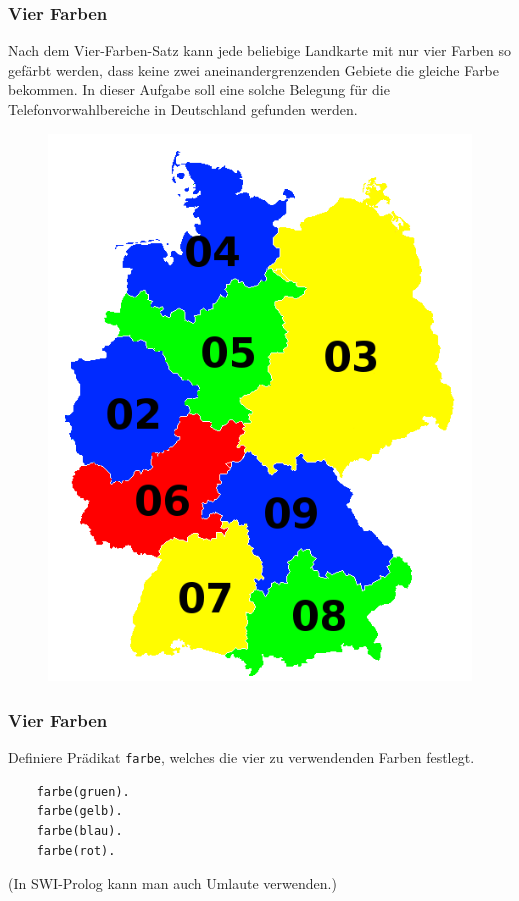 \documentclass{beamer}
\date{2016-12-12/13}
\begin{document}
\normalsize
\normalem

\begin{frame}[plain]
  \titlepage
\end{frame}

\begin{frame}
  \frametitle{Vier Farben}
  Nach dem Vier-Farben-Satz kann jede beliebige Landkarte mit nur vier Farben so gefärbt werden,
  dass keine zwei aneinandergrenzenden Gebiete die gleiche Farbe bekommen.
  In dieser Aufgabe soll eine solche Belegung für die Telefonvorwahlbereiche in Deutschland gefunden werden.
  \begin{figure}
    \includegraphics[height=0.5\textheight]{tut7-deutschland}
  \end{figure}
\end{frame}

\begin{frame}[fragile]
  \frametitle{Vier Farben}
  Definiere Prädikat \lstinline{farbe}, welches die vier zu verwendenden Farben festlegt.
  \pause
  \begin{lstlisting}
    farbe(gruen).
    farbe(gelb).
    farbe(blau).
    farbe(rot).
  \end{lstlisting}
  (In SWI-Prolog kann man auch Umlaute verwenden.)
\end{frame}
\end{document}
